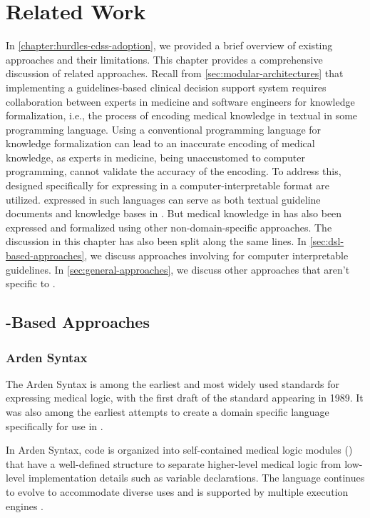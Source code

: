 \chapter{Related Work}\label{chapter:related-work}

In \autoref{chapter:hurdles-cdss-adoption}, we provided a brief
overview of existing approaches and their limitations. This chapter
provides a comprehensive discussion of related approaches. Recall
from \autoref{sec:modular-architectures} that implementing a guidelines-based
clinical decision support system requires collaboration between
experts in medicine and software engineers for knowledge formalization, i.e.,
the process of encoding medical knowledge in textual
\BPGs{} in some programming language. Using a conventional programming
language for knowledge formalization can lead to an inaccurate
encoding of medical knowledge, as experts in medicine, being unaccustomed
to computer programming, cannot validate the accuracy of the encoding.
To address this, \DSLs{} designed specifically for expressing
\BPGs{} in a computer-interpretable format are utilized. \BPGs{} expressed
in such languages can serve as both textual guideline documents and knowledge
bases in \CDSSs{}. But medical knowledge in \BPGs{} has also been expressed
and formalized using other non-domain-specific approaches. The discussion in
this chapter has also been split along the same lines. In \autoref{sec:dsl-based-approaches}, we discuss approaches involving \DSLs{} for
computer interpretable guidelines. In \autoref{sec:general-approaches}, we
discuss other approaches that aren't specific to \BPGs{}.

\section{\DSL{}-Based Approaches}\label{sec:dsl-based-approaches}

\subsection{Arden Syntax}\label{sec:arden-syntax}

The Arden Syntax is among the earliest and most widely used
standards for expressing medical logic, with the first
draft of the standard appearing in 1989.
It was also among the earliest attempts to create a domain
specific language specifically for use in \CDSSs{} \cite{SamwaldJBI12}.

In Arden Syntax, code is organized into self-contained medical
logic modules (\MLMs{}) that have a well-defined structure to
separate higher-level medical logic from low-level implementation
details such as variable declarations. The language continues to
evolve to accommodate diverse uses and is supported by multiple execution
engines \cite{AnandMed04,KaradimasAMIA02}.

